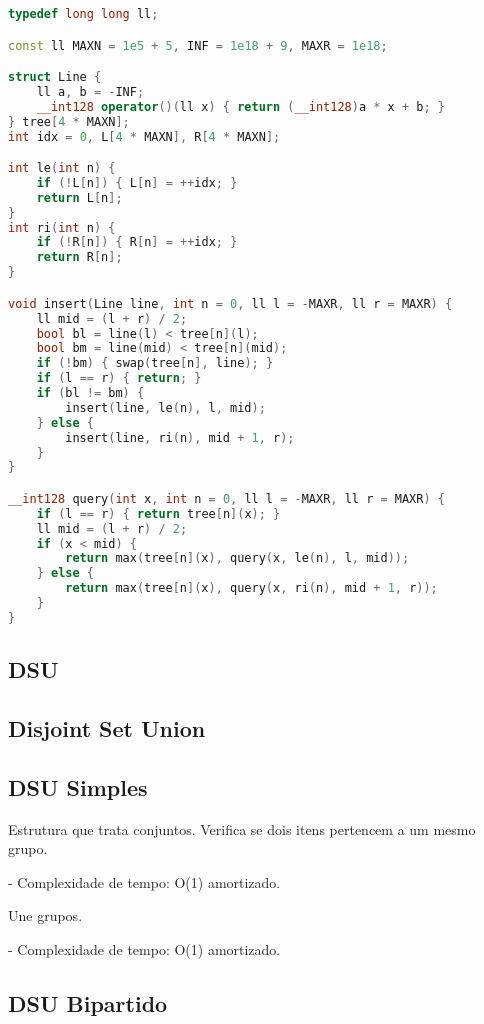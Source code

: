 \documentclass[11pt, a4paper, twoside]{article}
\begin{document}
\begin{lstlisting}[language=C++]
typedef long long ll;

const ll MAXN = 1e5 + 5, INF = 1e18 + 9, MAXR = 1e18;

struct Line {
    ll a, b = -INF;
    __int128 operator()(ll x) { return (__int128)a * x + b; }
} tree[4 * MAXN];
int idx = 0, L[4 * MAXN], R[4 * MAXN];

int le(int n) {
    if (!L[n]) { L[n] = ++idx; }
    return L[n];
}
int ri(int n) {
    if (!R[n]) { R[n] = ++idx; }
    return R[n];
}

void insert(Line line, int n = 0, ll l = -MAXR, ll r = MAXR) {
    ll mid = (l + r) / 2;
    bool bl = line(l) < tree[n](l);
    bool bm = line(mid) < tree[n](mid);
    if (!bm) { swap(tree[n], line); }
    if (l == r) { return; }
    if (bl != bm) {
        insert(line, le(n), l, mid);
    } else {
        insert(line, ri(n), mid + 1, r);
    }
}

__int128 query(int x, int n = 0, ll l = -MAXR, ll r = MAXR) {
    if (l == r) { return tree[n](x); }
    ll mid = (l + r) / 2;
    if (x < mid) {
        return max(tree[n](x), query(x, le(n), l, mid));
    } else {
        return max(tree[n](x), query(x, ri(n), mid + 1, r));
    }
}
\end{lstlisting}

\subsection{DSU}

\subsection{Disjoint Set Union}



\subsection{DSU Simples}

Estrutura que trata conjuntos.  
Verifica se dois itens pertencem a um mesmo grupo.

- Complexidade de tempo: O(1) amortizado.

Une grupos.

- Complexidade de tempo: O(1) amortizado.

\subsection{DSU Bipartido}
\end{document}
